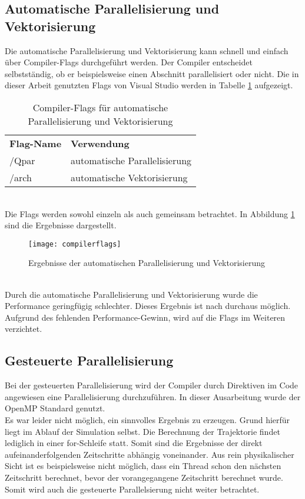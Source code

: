 \subsection{Automatische Parallelisierung und Vektorisierung}
Die automatische Parallelisierung und Vektorisierung kann schnell und einfach über Compiler-Flags durchgeführt werden. Der Compiler entscheidet selbstständig, ob er beispielsweise einen Abschnitt parallelisiert oder nicht. Die in dieser Arbeit genutzten Flags von Visual Studio werden in Tabelle \ref{tab:compilerflags} aufgezeigt. 
\begin{table}[h]
\centering	\begin{tabular}{ll}
		\textbf{Flag-Name} & \textbf{Verwendung}\\
		/Qpar & automatische Parallelisierung\\
		/arch & automatische Vektorisierung
	\end{tabular}
\caption{Compiler-Flags für automatische Parallelisierung und Vektorisierung}
\label{tab:compilerflags}
\end{table}\noindent\\
Die Flags werden sowohl einzeln als auch gemeinsam betrachtet. In Abbildung \ref{fig:compilerflags} sind die Ergebnisse dargestellt.\newpage
\begin{figure}[h]
	\centering
	\texttt{[image: compilerflags]}
	\caption{Ergebnisse der automatischen Parallelisierung und Vektorisierung}
	\label{fig:compilerflags}
\end{figure}\noindent\\
Durch die automatische Parallelisierung und Vektorisierung wurde die Performance geringfügig schlechter. Dieses Ergebnis ist nach \cite{Kessler.Wintersemester201718} durchaus möglich. Aufgrund des fehlenden Performance-Gewinn, wird auf die Flags im Weiteren verzichtet. 
\subsection{Gesteuerte Parallelisierung}
Bei der gesteuerten Parallelisierung wird der Compiler durch Direktiven im Code angewiesen eine Parallelisierung durchzuführen. In dieser Ausarbeitung wurde der OpenMP Standard genutzt.\\
Es war leider nicht möglich, ein sinnvolles Ergebnis zu erzeugen. Grund hierfür liegt im Ablauf der Simulation selbst. Die Berechnung der Trajektorie findet lediglich in einer for-Schleife statt. Somit sind die Ergebnisse der direkt aufeinanderfolgenden Zeitschritte abhängig voneinander. Aus rein physikalischer Sicht ist es beispielsweise nicht möglich, dass ein Thread schon den nächsten Zeitschritt berechnet, bevor der vorangegangene Zeitschritt berechnet wurde. Somit wird auch die gesteuerte Parallelsierung nicht weiter betrachtet.\\

